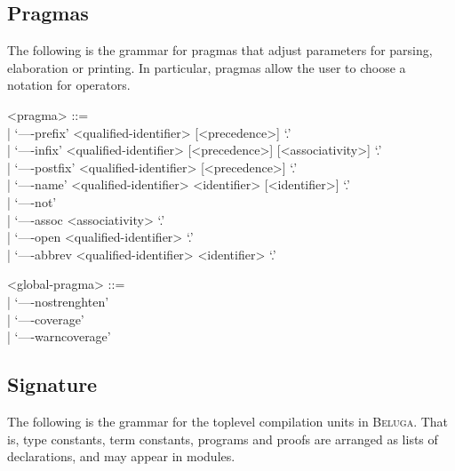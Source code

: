 \documentclass[11pt]{article}
\newcommand{\Beluga}{\textsc{Beluga}\xspace}
\begin{document}
\subsection{Pragmas}\label{section:syntax-pragmas}

The following is the grammar for pragmas that adjust parameters for parsing, elaboration or printing.
In particular, pragmas allow the user to choose a notation for operators.

\begin{grammar}
<pragma> ::= \hfill\\
| `----prefix' <qualified-identifier> [<precedence>] `.'\\
| `----infix' <qualified-identifier> [<precedence>] [<associativity>] `.'\\
| `----postfix' <qualified-identifier> [<precedence>] `.'\\
| `----name' <qualified-identifier> <identifier> [<identifier>] `.'\\
| `----not'\\
| `----assoc <associativity> `.'\\
| `----open <qualified-identifier> `.'\\
| `----abbrev <qualified-identifier> <identifier> `.'

<global-pragma> ::= \hfill\\
| `----nostrenghten'\\
| `----coverage'\\
| `----warncoverage'
\end{grammar}

\subsection{Signature}\label{section:syntax-signature}

The following is the grammar for the toplevel compilation units in \Beluga.
That is, type constants, term constants, programs and proofs are arranged as lists of declarations, and may appear in modules.
\end{document}
